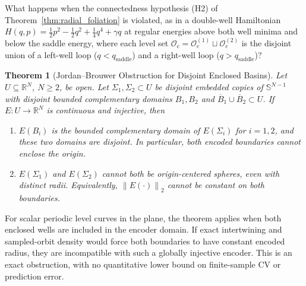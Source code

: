 \documentclass[10pt]{article}
\newtheorem{theorem}{Theorem}
\theoremstyle{definition}
\theoremstyle{remark}
\newcommand{\R}{\mathbb{R}}
\newcommand{\Sp}{\mathbb{S}}
\newcommand{\norm}[1]{\left\lVert #1 \right\rVert}
\begin{document}
What happens when the connectedness hypothesis (H2) of Theorem~\ref{thm:radial_foliation} is violated, as in a double-well Hamiltonian $H(q, p) = \frac{1}{2}p^2 - \frac{1}{2}q^2 + \frac{1}{4}q^4 + \gamma q$ at regular energies above both well minima and below the saddle energy, where each level set $\mathcal{O}_c = \mathcal{O}_c^{(1)} \sqcup \mathcal{O}_c^{(2)}$ is the disjoint union of a left-well loop ($q < q_{\mathrm{saddle}}$) and a right-well loop ($q > q_{\mathrm{saddle}}$)?

\begin{theorem}[Jordan--Brouwer Obstruction for Disjoint Enclosed Basins]
\label{thm:jordan_brouwer}
Let $U\subseteq\R^N$, $N\ge2$, be open. Let $\Sigma_1,\Sigma_2\subset U$ be disjoint embedded copies of $\Sp^{N-1}$ with disjoint bounded complementary domains $B_1,B_2$ and $\overline B_1\cup\overline B_2\subset U$. If $E:U\to\R^N$ is continuous and injective, then
\begin{enumerate}
    \item[\textbf{(a)}] $E(B_i)$ is the bounded complementary domain of $E(\Sigma_i)$ for $i=1,2$, and these two domains are disjoint. In particular, both encoded boundaries cannot enclose the origin.
    \item[\textbf{(b)}] $E(\Sigma_1)$ and $E(\Sigma_2)$ cannot both be origin-centered spheres, even with distinct radii. Equivalently, $\norm{E(\cdot)}_2$ cannot be constant on both boundaries.
\end{enumerate}
\end{theorem}

For scalar periodic level curves in the plane, the theorem applies when both enclosed wells are included in the encoder domain. If exact intertwining and sampled-orbit density would force both boundaries to have constant encoded radius, they are incompatible with such a globally injective encoder. This is an exact obstruction, with no quantitative lower bound on finite-sample CV or prediction error.
\end{document}
